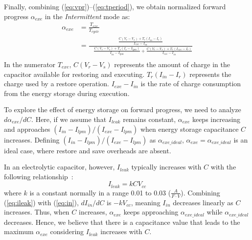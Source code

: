 Finally, combining (\ref{eq:vpr})--(\ref{eq:tperiod}), we obtain normalized forward progress $\alpha_{exe}$ in the \textit{Intermittent} mode as:
\begin{equation}
    \begin{aligned}
        \alpha_{exe} &= \frac{T_{exe}}{T_{cycle}} \\ %
                     &= \frac{\frac{C (V_{r} - V_{s}) + T_{r} (I_{in} - I_{r})} {I_{exe} - I_{in}}}{\quad \frac{C (V_{r} - V_{s}) + T_{s} (I_{s} - I_{lpm})}{I_{in} - I_{lpm}} + \frac{C (V_{r} - V_{s}) + T_{r} (I_{exe} - I_{r})}{I_{exe} - I_{in}}} \\
    \end{aligned}
    \label{eq:texepercent}
\end{equation}
In the numerator $T_{exe}$, $C(V_{r} - V_{s})$ represents the amount of charge in the capacitor available for restoring and executing. $T_{r} (I_{in} - I_{r})$ represents the charge used by a restore operation. $I_{exe} - I_{in}$ is the rate of charge consumption from the energy storage during execution.


To explore the effect of energy storage on forward progress, we need to analyze $d\alpha_{exe} / dC$. Here, if we assume that $I_{leak}$ remains constant, $\alpha_{exe}$ keeps increasing and approaches $(I_{in} - I_{lpm}) / (I_{exe} - I_{lpm})$ when energy storage capacitance $C$ increases. Defining $(I_{in} - I_{lpm}) / (I_{exe} - I_{lpm})$ as $\alpha_{exe\_ideal}$, $\alpha_{exe} = \alpha_{exe\_ideal}$ is an ideal case, where restore and save overheads are absent.

In an electrolytic capacitor, however, $I_{leak}$ typically increases with $C$ with the following relationship~\cite{avxleakage}:
\begin{equation}
    I_{leak} = kCV_{cc}
    \label{eq:ileak}
\end{equation}
where $k$ is a constant normally in a range 0.01 to 0.03 ($\frac{A}{F \cdot V}$). Combining (\ref{eq:ileak}) with (\ref{eq:in}), $dI_{in} / dC$ is $-kV_{cc}$, meaning $I_{in}$ decreases linearly as $C$ increases. Thus, when $C$ increases, $\alpha_{exe}$ keeps approaching $\alpha_{exe\_ideal}$ while $\alpha_{exe\_ideal}$ decreases. Hence, we believe that there is a capacitance value that leads to the maximum $\alpha_{exe}$ considering $I_{leak}$ increases with $C$.


